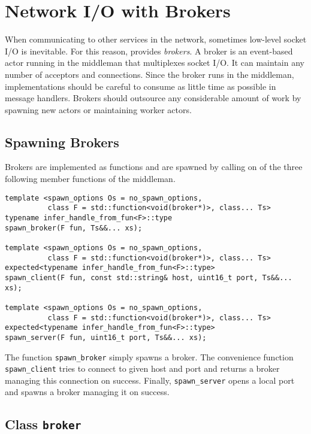 \section{Network I/O with Brokers}
\label{broker}

When communicating to other services in the network, sometimes low-level socket I/O is inevitable.
For this reason, \lib provides \emph{brokers}.
A broker is an event-based actor running in the middleman that multiplexes socket I/O.
It can maintain any number of acceptors and connections.
Since the broker runs in the middleman, implementations should be careful to consume as little time as possible in message handlers.
Brokers should outsource any considerable amount of work by spawning new actors or maintaining worker actors.

\subsection{Spawning Brokers}

Brokers are implemented as functions and are spawned by calling on of the three following member functions of the middleman.

\begin{lstlisting}
template <spawn_options Os = no_spawn_options,
          class F = std::function<void(broker*)>, class... Ts>
typename infer_handle_from_fun<F>::type
spawn_broker(F fun, Ts&&... xs);

template <spawn_options Os = no_spawn_options,
          class F = std::function<void(broker*)>, class... Ts>
expected<typename infer_handle_from_fun<F>::type>
spawn_client(F fun, const std::string& host, uint16_t port, Ts&&... xs);

template <spawn_options Os = no_spawn_options,
          class F = std::function<void(broker*)>, class... Ts>
expected<typename infer_handle_from_fun<F>::type>
spawn_server(F fun, uint16_t port, Ts&&... xs);
\end{lstlisting}

The function \lstinline^spawn_broker^ simply spawns a broker. The convenience function \lstinline^spawn_client^ tries to connect to given host and port and returns a broker managing this connection on success. Finally, \lstinline^spawn_server^ opens a local port and spawns a broker managing it on success.

\subsection{Class \texttt{broker}}
\label{broker-class}

